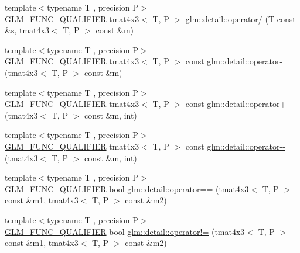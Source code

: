 \begin{DoxyCompactItemize}
\item 
{\footnotesize template$<$typename T , precision P$>$ }\\\hyperlink{setup_8hpp_a33fdea6f91c5f834105f7415e2a64407}{G\+L\+M\+\_\+\+F\+U\+N\+C\+\_\+\+Q\+U\+A\+L\+I\+F\+I\+ER} tmat4x3$<$ T, P $>$ \hyperlink{namespaceglm_1_1detail_a0800070f7d56dffb627c9ecdeb7f2b4e}{glm\+::detail\+::operator/} (T const \&s, tmat4x3$<$ T, P $>$ const \&m)
\item 
{\footnotesize template$<$typename T , precision P$>$ }\\\hyperlink{setup_8hpp_a33fdea6f91c5f834105f7415e2a64407}{G\+L\+M\+\_\+\+F\+U\+N\+C\+\_\+\+Q\+U\+A\+L\+I\+F\+I\+ER} tmat4x3$<$ T, P $>$ const \hyperlink{namespaceglm_1_1detail_a7feb70839fe8a125a463308e33451846}{glm\+::detail\+::operator-\/} (tmat4x3$<$ T, P $>$ const \&m)
\item 
{\footnotesize template$<$typename T , precision P$>$ }\\\hyperlink{setup_8hpp_a33fdea6f91c5f834105f7415e2a64407}{G\+L\+M\+\_\+\+F\+U\+N\+C\+\_\+\+Q\+U\+A\+L\+I\+F\+I\+ER} tmat4x3$<$ T, P $>$ const \hyperlink{namespaceglm_1_1detail_a995ba0b2b964afbe7b5aa353542f3527}{glm\+::detail\+::operator++} (tmat4x3$<$ T, P $>$ const \&m, int)
\item 
{\footnotesize template$<$typename T , precision P$>$ }\\\hyperlink{setup_8hpp_a33fdea6f91c5f834105f7415e2a64407}{G\+L\+M\+\_\+\+F\+U\+N\+C\+\_\+\+Q\+U\+A\+L\+I\+F\+I\+ER} tmat4x3$<$ T, P $>$ const \hyperlink{namespaceglm_1_1detail_aa7bb392ad3632bb123f114c4fe356a2a}{glm\+::detail\+::operator-\/-\/} (tmat4x3$<$ T, P $>$ const \&m, int)
\item 
{\footnotesize template$<$typename T , precision P$>$ }\\\hyperlink{setup_8hpp_a33fdea6f91c5f834105f7415e2a64407}{G\+L\+M\+\_\+\+F\+U\+N\+C\+\_\+\+Q\+U\+A\+L\+I\+F\+I\+ER} bool \hyperlink{namespaceglm_1_1detail_a1f7eda19192e64b32e574c2ac170af53}{glm\+::detail\+::operator==} (tmat4x3$<$ T, P $>$ const \&m1, tmat4x3$<$ T, P $>$ const \&m2)
\item 
{\footnotesize template$<$typename T , precision P$>$ }\\\hyperlink{setup_8hpp_a33fdea6f91c5f834105f7415e2a64407}{G\+L\+M\+\_\+\+F\+U\+N\+C\+\_\+\+Q\+U\+A\+L\+I\+F\+I\+ER} bool \hyperlink{namespaceglm_1_1detail_a176acdf097af23a5a1a8d1bc04b31500}{glm\+::detail\+::operator!=} (tmat4x3$<$ T, P $>$ const \&m1, tmat4x3$<$ T, P $>$ const \&m2)
\end{DoxyCompactItemize}

